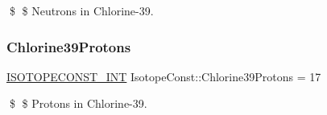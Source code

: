 \$ \$ Neutrons in Chlorine-\/39. \mbox{\label{group___isotope_const-_chlorine-_cl39_ga214e9b9e3adc991c4d235bb6202daffa}} 
\subsubsection{\texorpdfstring{Chlorine39\+Protons}{Chlorine39Protons}}
{\footnotesize\ttfamily \mbox{\hyperlink{group___isotope_const-_macros_ga5f18360b3e99483a35c32d789e62621c}{I\+S\+O\+T\+O\+P\+E\+C\+O\+N\+S\+T\+\_\+\+I\+NT}} Isotope\+Const\+::\+Chlorine39\+Protons = 17}

\$ \$ Protons in Chlorine-\/39. 